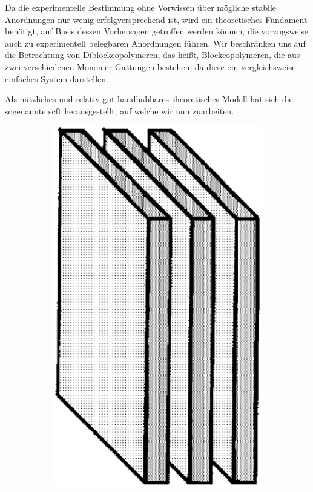Da die experimentelle Bestimmung ohne Vorwissen über mögliche stabile Anordnungen nur wenig erfolgversprechend ist, wird ein theoretisches Fundament benötigt, auf Basis dessen Vorhersagen getroffen werden können, die vorzugsweise auch zu experimentell belegbaren Anordnungen führen.
Wir beschränken uns auf die Betrachtung von Diblockcopolymeren, das heißt, Blockcopolymeren, die aus zwei verschiedenen Monomer-Gattungen bestehen, da diese ein vergleichsweise einfaches System darstellen.

Als nützliches und relativ gut handhabbares theoretisches Modell hat sich die sogenannte \ac{scft} herausgestellt, auf welche wir nun zuarbeiten.

\begin{figure}[tb]
    \centering
    \begin{subfigure}[b]{0.15\textwidth}
        \includegraphics[width=\textwidth]{figures/einleitung/fig1}

\end{subfigure}
\end{figure}
